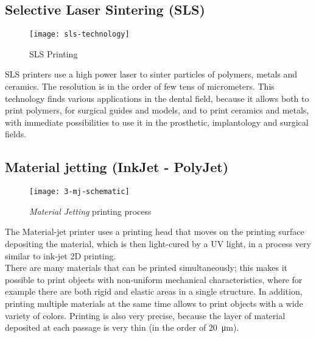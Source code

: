 \subsection{Selective Laser Sintering (SLS)}

\begin{wrapfigure} {R} {0.40\textwidth}
\vspace{-30pt}
	\begin{center}
	\texttt{[image: sls-technology]}
    \caption{SLS Printing}
    \label{fig:sls-technology}
    \end{center}
\vspace{-40pt}
\end{wrapfigure}

SLS printers use a high power laser to sinter particles of polymers, metals and ceramics. The resolution is in the order of few tens of micrometers. This technology finds various applications in the dental field, because it allows both to print polymers, for surgical guides and models, and to print ceramics and metals, with immediate possibilities to use it in the prosthetic, implantology and surgical fields.
\newpage

\subsection{Material jetting (InkJet - PolyJet)}

\begin{wrapfigure} {R} {0.5\textwidth}
\vspace{-20pt}
	\begin{center}
	\texttt{[image: 3-mj-schematic]}
    \caption{\emph{Material Jetting} printing process}
    \label{fig:3-mj-schematic}
    \end{center}
\vspace{-20pt}
\end{wrapfigure}

The Material-jet printer uses a printing head that moves on the printing surface depositing the material, which is then light-cured by a UV light, in a process very similar to ink-jet 2D printing. \\
There are many materials that can be printed simultaneously; this makes it possible to print objects with non-uniform mechanical characteristics, where for example there are both rigid and elastic areas in a single structure. In addition, printing multiple materials at the same time allows to print objects with a wide variety of colors. Printing is also very precise, because the layer of material deposited at each passage is very thin (in the order of \SI{20}{\micro\metre}).

